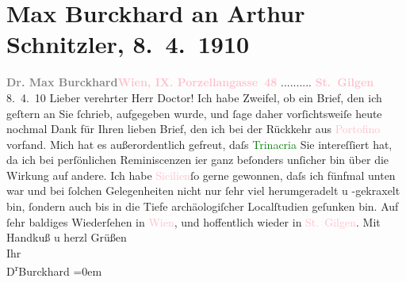 

               \section[Max Burckhard an Arthur Schnitzler, 8. 4. 1910]{ Max Burckhard an Arthur Schnitzler, 8. 4. 1910}\nopagebreak{}\rehead{ }\normalsize\beginnumbering{} \toendnotes[C]{\smallbreak\pagebreak[2]} 
\pstart
           \noindent{}{\pb}\textcolor{gray}{\textbf{Dr. Max Burckhard}}\hfill \textcolor{gray}{\textbf{\textcolor{pink}{Wien, IX. Porzellangasse 48}{}\ledrightnote{\textcolor{pink}{Porzellangasse}}}}{ }..........\pend
           \pstart
           \raggedleft{}\textcolor{gray}{\textbf{\textcolor{pink}{St. Gilgen}{}\ledrightnote{\textcolor{pink}{St. Gilgen}}}}{ }8. 4. 10\pend
           \pstart{}Lieber verehrter Herr Doctor!\pend\pstart
           Ich habe Zweifel, ob ein Brief, den ich geſtern an Sie ſchrieb, aufgegeben wurde,
                    und ſage daher vorſichtsweiſe heute nochmal Dank für Ihren lieben Brief, den ich
                    bei der Rückkehr aus \textcolor{pink}{Portofino}{}\ledrightnote{\textcolor{pink}{Portofino}} vorfand. Mich
                    hat es außerordentlich gefreut, daſs \textcolor{green}{Trinacria}{}\ledrightnote{\textcolor{green}{Trinacria}}
                    Sie intereſſiert hat, da ich bei perſönlichen Reminiscenzen i{\geminationm}er ganz beſonders unſicher bin über die Wirkung
                    auf andere. Ich habe \textcolor{pink}{Sicilien}{}\ledrightnote{\textcolor{pink}{Sizilien}}{ }ſo gerne gewonnen, daſs ich fünfmal unten war
                    und bei ſolchen Gelegenheiten nicht nur ſehr viel herumgeradelt u -gekraxelt
                    bin, ſondern auch bis in die Tiefe archäologiſcher Localſtudien geſunken
                    bin.\pend
           \pstart
           Auf ſehr baldiges Wiederſehen in \textcolor{pink}{Wien}{}\ledrightnote{\textcolor{pink}{Wien}}, und
                    hoffentlich wieder in \textcolor{pink}{St. Gilgen}{}\ledrightnote{\textcolor{pink}{St. Gilgen}}. Mit Handkuß u
                    herzl Grüßen{\\[\baselineskip]}Ihr{\\[\baselineskip]}\spacefill\mbox{D\textsuperscript{r}Burckhard}\pend
           \leftskip=0em{}\endnumbering{}  
      